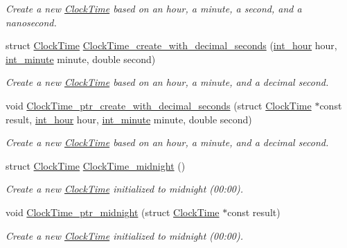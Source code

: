 \begin{DoxyCompactItemize}
\begin{DoxyCompactList}\small\item\em Create a new \hyperlink{structClockTime}{Clock\-Time} based on an hour, a minute, a second, and a nanosecond. \end{DoxyCompactList}\item 
struct \hyperlink{structClockTime}{Clock\-Time} \hyperlink{clock-time_8h_a519b7c6074cf1addc815f7495048c30b}{Clock\-Time\-\_\-create\-\_\-with\-\_\-decimal\-\_\-seconds} (\hyperlink{types_8h_abc83767329d565949a30f9990b5b2323}{int\-\_\-hour} hour, \hyperlink{types_8h_ac1c9417e7360815b48bbc1efa2b8240c}{int\-\_\-minute} minute, double second)
\begin{DoxyCompactList}\small\item\em Create a new \hyperlink{structClockTime}{Clock\-Time} based on an hour, a minute, and a decimal second. \end{DoxyCompactList}\item 
void \hyperlink{clock-time_8h_a87e3a723bf677b7be296bc439a05b910}{Clock\-Time\-\_\-ptr\-\_\-create\-\_\-with\-\_\-decimal\-\_\-seconds} (struct \hyperlink{structClockTime}{Clock\-Time} $\ast$const result, \hyperlink{types_8h_abc83767329d565949a30f9990b5b2323}{int\-\_\-hour} hour, \hyperlink{types_8h_ac1c9417e7360815b48bbc1efa2b8240c}{int\-\_\-minute} minute, double second)
\begin{DoxyCompactList}\small\item\em Create a new \hyperlink{structClockTime}{Clock\-Time} based on an hour, a minute, and a decimal second. \end{DoxyCompactList}\item 
struct \hyperlink{structClockTime}{Clock\-Time} \hyperlink{clock-time_8h_ae320c2e30dedf0b33d5306b9e8841261}{Clock\-Time\-\_\-midnight} ()
\begin{DoxyCompactList}\small\item\em Create a new \hyperlink{structClockTime}{Clock\-Time} initialized to midnight (00\-:00). \end{DoxyCompactList}\item 
void \hyperlink{clock-time_8h_ab9a04af6aea163ab7682efd2ac6d2e71}{Clock\-Time\-\_\-ptr\-\_\-midnight} (struct \hyperlink{structClockTime}{Clock\-Time} $\ast$const result)
\begin{DoxyCompactList}\small\item\em Create a new \hyperlink{structClockTime}{Clock\-Time} initialized to midnight (00\-:00). \end{DoxyCompactList}\item 

\end{DoxyCompactItemize}

